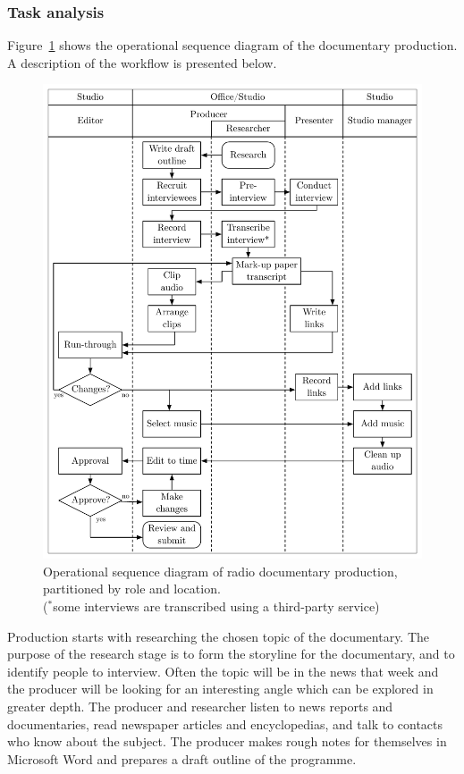 \subsubsection{Task analysis}
Figure~\ref{fig:ethno-docs-workflow} shows the operational sequence diagram of the documentary production.  A
description of the workflow is presented below.

\begin{figure}[ht]
  \centering
  \includegraphics[width=4.5in]{figs/docs-workflow.pdf}
  \caption{Operational sequence diagram of radio documentary production, partitioned by role and location.\\
  {\footnotesize ($^{*}$some interviews are transcribed using a third-party service)}}
  \label{fig:ethno-docs-workflow}
\end{figure}

Production starts with researching the chosen topic of the documentary.  The purpose of the research stage is to form
the storyline for the documentary, and to identify people to interview.  Often the topic will be in the news that week
and the producer will be looking for an interesting angle which can be explored in greater depth.  The producer and
researcher listen to news reports and documentaries, read newspaper articles and encyclopedias, and talk to contacts
who know about the subject.  The producer makes rough notes for themselves in Microsoft Word and prepares a draft
outline of the programme.

